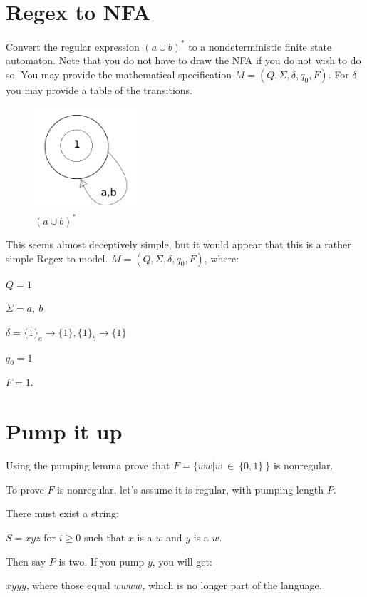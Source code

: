 \documentclass[10pt,reqno,sumlimits]{amsart}
\theoremstyle{plain}
\theoremstyle{definition}
\newcommand{\1}{{\bf 1}}
\numberwithin{equation}{section}
\begin{document}
\section{Regex to NFA}
Convert the regular expression $(a \cup b)^*$ to a nondeterministic finite state automaton. Note that you do not have to draw the NFA if you do not wish to do so. You may provide the mathematical specification $M = (Q, \Sigma, \delta, q_0 , F )$. For $\delta$ you may provide a table of the transitions.

\begin{figure}[htbp]
\centerline{
    \mbox{\includegraphics[width=1.5in]{algorithms2_3.pdf}}
  }
  \caption{$(a \cup b)^*$}
  \label{fig:fit}
\end{figure}

\hspace{0.5in} This seems almost deceptively simple, but it would appear that this is a rather simple Regex to model. $M = (Q, \Sigma, \delta, q_0 , F )$, where:

\vspace{0.2in}
$ Q = 1$

$\Sigma = a,\ b$

$\delta = \{1\}_a \rightarrow \{1\}, \{1\}_b \rightarrow \{1\}$

$q_0 = 1$

$F = 1$.
\vspace{0.2in}

\section{Pump it up}
Using the pumping lemma prove that $F = \{ww|w\ \in\ \{0, 1\}\ \}$ is nonregular.

To prove $F$ is nonregular, let's assume it is regular, with pumping length $P$.

There must exist a string:

\hspace{0.3in}$S = x y z$ for $i \geq 0$ such that $x$ is a $w$ and $y$ is a $w$.

Then say $P$ is two. If you pump $y$, you will get:

\hspace{0.3in}$xyyy$, where those equal $wwww$, which is no longer part of the language.
\end{document}
